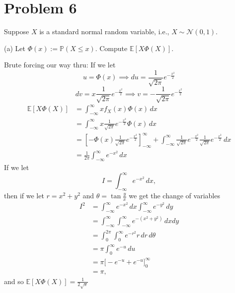 \documentclass[11pt]{article}
\newcommand{\bbE}{\mathbb{E}}
\begin{document}
\newpage

\section*{Problem 6}
Suppose \(X\) is a standard normal random variable, i.e., \(X \sim \mathcal{N}(0,1)\).

(a) Let \(\Phi(x) := \mathbb{P}(X \leq x)\). Compute \(\mathbb{E}[X \Phi(X)]\).
\begin{solution}
    Brute forcing our way thru:
If we let 
\[u = \Phi(x) \implies du = \frac{1}{\sqrt{2\pi}}e^{-\frac{x^2}{2}}\]
\[dv = x \frac{1}{\sqrt{2\pi}}e^{-\frac{x^2}{2}} \implies v = -\frac{1}{\sqrt{2\pi}}e^{-\frac{x^2}{2}}\]
\begin{align*}
    \bbE[X \Phi(X)] &= \int_{-\infty}^\infty x f_X(x)\Phi(x)\,dx\\
    &= \int_{-\infty}^\infty x \frac{1}{\sqrt{2\pi}}e^{-\frac{x^2}{2}}\Phi(x)\,dx\\
    &= [-\Phi(x)\frac{1}{\sqrt{2\pi}}e^{-\frac{x^2}{2}}]_{-\infty}^\infty + \int_{-\infty}^\infty\frac{1}{\sqrt{2\pi}}e^{-\frac{x^2}{2}}\frac{1}{\sqrt{2\pi}}e^{-\frac{x^2}{2}} \,dx\\
    &= \frac{1}{2\pi}\int_{-\infty}^\infty  e^{-x^2}\,dx
\end{align*}
If we let 
\[I = \int_{-\infty}^\infty e^{-x^2}\,dx,\] then if we let $r= x^2 + y^2$ and $\theta = \tan \frac{y}{x}$ we get the change of variables
\begin{align*}
I^2 &= \int_{-\infty}^\infty e^{-x^2}\,dx \int_{-\infty}^\infty e^{-y^2}\,dy\\
&= \int_{-\infty}^\infty\int_{-\infty}^\infty e^{-(x^2 + y^2)}\,dxdy\\
&= \int_0^{2\pi}\int_0^\infty e^{-r^2}r\,dr\,d\theta\\
&= \pi \int_0^\infty e^{-u}\,du\\
&= \pi \bigg[-e^{-u} + e^{-u}\bigg]_0^\infty\\
&= \pi,
\end{align*}
and so $\bbE[X \Phi(X)] = \frac{1}{2\sqrt{\pi}}$
\end{solution}
\end{document}
